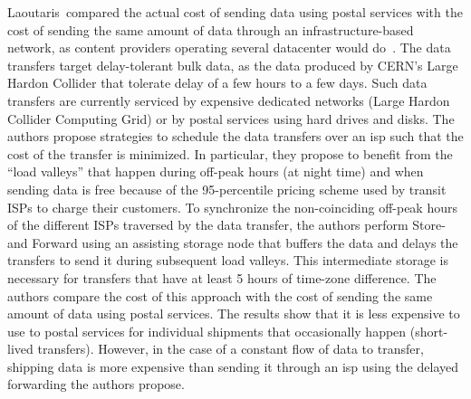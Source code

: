 Laoutaris~\etal compared the actual cost of sending data using postal services with the cost of sending the same amount of data through an infrastructure-based network, as content providers operating several datacenter would do~\cite{laoutaris2009delay,laoutaris2013delay}. The data transfers target delay-tolerant bulk data, as the data produced by CERN's Large Hardon Collider that tolerate delay of a few hours to a few days. Such data transfers are currently serviced by expensive dedicated networks (\eg Large Hardon Collider Computing Grid) or by postal services using hard drives and disks. The authors propose strategies to schedule the data transfers over an \acrfull{isp} such that the cost of the transfer is minimized. In particular, they propose to benefit from the ``load valleys'' that happen during off-peak hours (\eg at night time) and when sending data is free because of the 95-percentile pricing scheme used by transit ISPs to charge their customers. To synchronize the non-coinciding off-peak hours of the different ISPs traversed by the data transfer, the authors perform Store-and Forward using an assisting storage node that buffers the data and delays the transfers to send it during subsequent load valleys. This intermediate storage is necessary for transfers that have at least 5 hours of time-zone difference. The authors compare the cost of this approach with the cost of sending the same amount of data using postal services. The results show that it is less expensive to use to postal services for individual shipments that occasionally happen (\eg short-lived transfers). However, in the case of a constant flow of data to transfer, shipping data is more expensive than sending it through an \acrshort{isp} using the delayed forwarding the authors propose.

